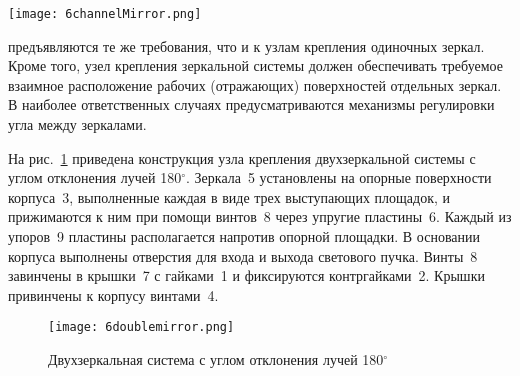 \begin{figure*}[h!]
	\texttt{[image: 6channelMirror.png]}
	\caption{ Примеры зеркал с сотовой структурой }
	\label{pic:6channelMirror}
\end{figure*}


  предъявляются те же требования, что и к узлам крепления одиночных зеркал. 
Кроме того, узел крепления зеркальной системы должен обеспечивать требуемое взаимное расположение рабочих (отражающих) поверхностей отдельных зеркал. 
В наиболее ответственных случаях предусматриваются механизмы регулировки угла между зеркалами.

На рис.~\ref{pic:6doublemirror} приведена конструкция узла крепления двухзеркальной системы с углом отклонения лучей 180$ ^\circ $. 
Зеркала~5 установлены на опорные поверхности корпуса~3, выполненные каждая в виде трех выступающих площадок, и прижимаются к ним при помощи винтов~8 через упругие пластины~6. 
Каждый из упоров~9 пластины располагается напротив опорной площадки. 
В основании корпуса выполнены отверстия для входа и выхода светового пучка. 
Винты~8 завинчены в крышки~7 с гайками~1 и фиксируются контргайками~2. 
Крышки привинчены к корпусу винтами~4.

\begin{figure}[h!]
	\begin{center}
		\texttt{[image: 6doublemirror.png]}
		\caption{ Двухзеркальная система с углом отклонения лучей 180$ ^\circ $ }
		\label{pic:6doublemirror}
	\end{center}
\end{figure}


